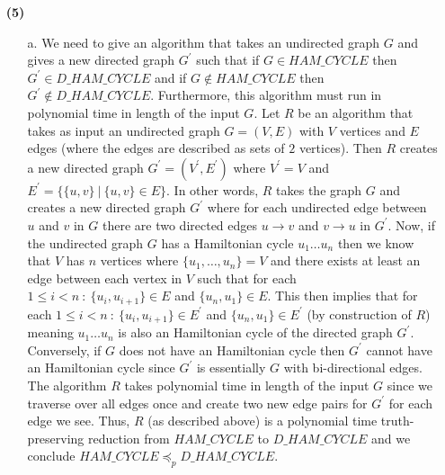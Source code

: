 \documentclass [10pt]{article}
\newcommand{\reduces}{\preceq}%
\begin{document}
\begin{enumerate}
\begin{enumerate}
	\end{enumerate}
	\item[\textbf{(5)}]
	\begin{enumerate}
		\item[a.]We need to give an algorithm that takes an undirected graph $G$ and gives a new directed graph $G^{\prime}$ such that if $G\in HAM\_CYCLE$ then $G^{\prime}\in D\_HAM\_CYCLE$ and if $G\notin HAM\_CYCLE$ then $G^{\prime}\notin D\_HAM\_CYCLE$. Furthermore, this algorithm must run in polynomial time in length of the input $G$. Let $R$ be an algorithm that takes as input an undirected graph $G=(V,E)$ with $V$ vertices and $E$ edges (where the edges are described as sets of $2$ vertices). Then $R$ creates a new directed graph $G^{\prime}=(V^{\prime},E^{\prime})$ where $V^{\prime}=V$ and $E^{\prime}=\{\{u,v\}\:|\:\{u,v\}\in E\}$. In other words, $R$ takes the graph $G$ and creates a new directed graph $G^{\prime}$ where for each undirected edge between $u$ and $v$ in $G$ there are two directed edges $u\rightarrow v$ and $v\rightarrow u$ in $G^{\prime}$. Now, if the undirected graph $G$ has a Hamiltonian cycle $u_{1}\dots u_{n}$ then we know that $V$ has $n$ vertices where $\{u_{1},\dots,u_{n}\}=V$ and there exists at least an edge between each vertex in $V$ such that for each $1\le i< n\::\:\{u_{i},u_{i+1}\}\in E$ and $\{u_{n},u_{1}\}\in E$. This then implies that for each $1\le i< n\::\:\{u_{i},u_{i+1}\}\in E^{\prime}$ and $\{u_{n},u_{1}\}\in E^{\prime}$ (by construction of $R$) meaning $u_{1}\dots u_{n}$ is also an Hamiltonian cycle of the directed graph $G^{\prime}$. Conversely, if $G$ does not have an Hamiltonian cycle then $G^{\prime}$ cannot have an Hamiltonian cycle since $G^{\prime}$ is essentially $G$ with bi-directional edges. The algorithm $R$ takes polynomial time in length of the input $G$ since we traverse over all edges once and create two new edge pairs for $G^{\prime}$ for each edge we see. Thus, $R$ (as described above) is a polynomial time truth-preserving reduction from $HAM\_CYCLE$ to $D\_HAM\_CYCLE$ and we conclude $HAM\_CYCLE\reduces_{p}D\_HAM\_CYCLE$.

\end{enumerate}
\end{enumerate}
\end{document}
